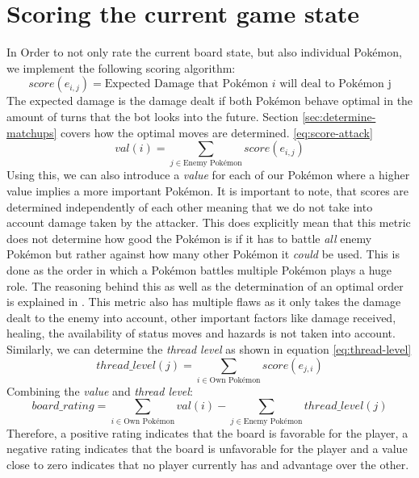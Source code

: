 \section{Scoring the current game state}
In Order to not only rate the current board state, but also individual Pokémon, we implement the following scoring 
algorithm:
\begin{equation}
\label{eq:score-attack}
	score(e_{i, j}) = \text{Expected Damage that Pokémon } i \text{ will deal to Pokémon j}
\end{equation}
The expected damage is the damage dealt if both Pokémon behave optimal in the amount of turns that the bot looks into
the future. Section \ref{sec:determine-matchups} covers how the optimal moves are determined.
\ref{eq:score-attack}
\begin{equation}
	val(i) = \sum_{j \in \text{Enemy Pokémon}} score(e_{i, j})
\end{equation}
Using this, we can also introduce a \textit{value} for each of our Pokémon where a higher value implies a more important
Pokémon. It is important to note, that scores are determined independently of each other meaning that we do not take
into account damage taken by the attacker. This does explicitly mean that this metric does not determine how good the 
Pokémon is if it has to battle \textit{all} enemy Pokémon but rather against how many other Pokémon it \textit{could}
be used. This is done as the order in which a Pokémon battles multiple Pokémon plays a huge role. The reasoning
behind this as well as the determination of an optimal order is explained in .
This metric also has multiple flaws as it only takes the damage dealt to the enemy into account, other important 
factors like damage received, healing, the availability of status moves and hazards is not taken into account. \\
Similarly, we can determine the \textit{thread level} as shown in equation \ref{eq:thread-level}
\begin{equation}
\label{eq:thread-level}
	thread\_level(j) = \sum_{i \in \text{Own Pokémon}} score(e_{j, i})
\end{equation}
Combining the \textit{value} and \textit{thread level}:
\begin{equation}
	board\_rating = \sum_{i \in \text{Own Pokémon}} val(i) - \sum_{j \in \text{Enemy Pokémon}} thread\_level(j)
\end{equation}
Therefore, a positive rating indicates that the board is favorable for the player, a negative rating indicates that
the board is unfavorable for the player and a value close to zero indicates that no player currently has and
advantage over the other.

